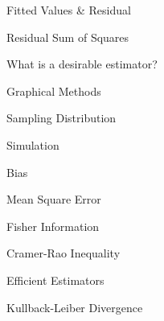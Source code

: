 \documentclass[11pt,a4paper]{article}
\begin{document}
\begin{definition}{Fitted Values & Residual}

\end{definition}

\begin{definition}{Residual Sum of Squares}

\end{definition}

\begin{remark}{What is a desirable estimator?}

\end{remark}

\begin{remark}{Graphical Methods}

\end{remark}

\begin{definition}{Sampling Distribution}

\end{definition}

\begin{definition}{Simulation}

\end{definition}

\begin{definition}{Bias}
\end{definition}

\begin{definition}{Mean Square Error}

\end{definition}

\begin{definition}{Fisher Information}
\end{definition}

\begin{theorem}{Cramer-Rao Inequality}

\end{theorem}

\begin{definition}{Efficient Estimators}
\end{definition}

\begin{definition}{Kullback-Leiber Divergence}

\end{definition}
\end{document}
